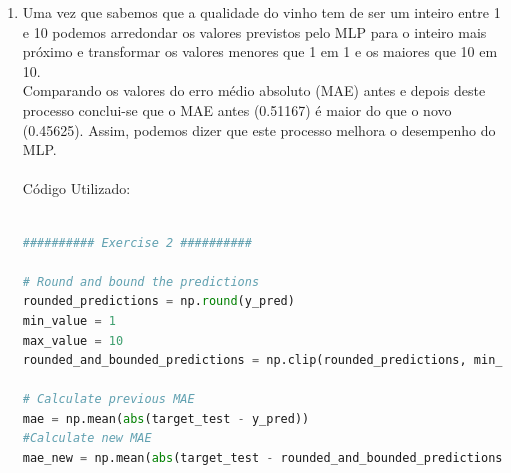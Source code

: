 \documentclass[a4paper,12pt]{article} %
\begin{document}
\begin{enumerate}
\begin{lstlisting}[language=Python]
# Training Test Split
variables_train, variables_test, target_train, target_test= train_test_split(variables, target, 
                                                                            train_size=0.8, stratify=target, random_state=0)

y_pred = np.zeros(len(target_test))

# Average the mlp regressor
for i in range(10):
    # Learn the MLP regressor 
    mlp = MLPRegressor(hidden_layer_sizes=(10,10), activation='relu', solver='adam', early_stopping=True, validation_fraction=0.2, random_state=i)
    #Predict output
    y_pred += mlp.fit(variables_train,target_train).predict(variables_test)

y_pred = y_pred/10

######### Exercise 1 ##########

# Calculate the residues
residues = abs(target_test - y_pred)
# Plot the residues

plt.hist(residues,bins=20)
plt.title('Histogram of the residues')
plt.xlabel('Residues')
plt.ylabel('Frequency')
plt.savefig('ex1_histogram.png')
plt.show()
    
\end{lstlisting}

\item Uma vez que sabemos que a qualidade do vinho tem de ser um inteiro entre 
1 e 10 podemos arredondar os valores previstos pelo MLP para o inteiro mais próximo
e transformar os valores menores que 1 em 1 e os maiores que 10 em 10.\\ Comparando 
os valores do erro médio absoluto (MAE) antes e depois deste processo conclui-se 
que o MAE antes (0.51167) é maior do que o novo (0.45625). Assim, podemos dizer que 
este processo melhora o desempenho do MLP.\\ \\

Código Utilizado:

\begin{lstlisting}[language=Python]

########## Exercise 2 ##########

# Round and bound the predictions
rounded_predictions = np.round(y_pred)
min_value = 1
max_value = 10 
rounded_and_bounded_predictions = np.clip(rounded_predictions, min_value, max_value)

# Calculate previous MAE
mae = np.mean(abs(target_test - y_pred))
#Calculate new MAE
mae_new = np.mean(abs(target_test - rounded_and_bounded_predictions))


\end{lstlisting}
\end{enumerate}
\end{document}
